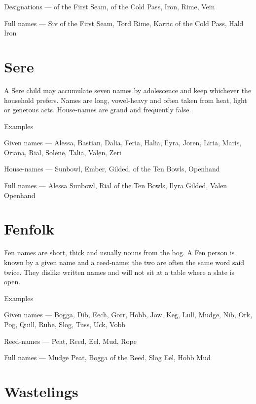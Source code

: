 \documentclass{design/chronicle}
\begin{document}
Designations — of the First Seam, of the Cold Pass, Iron, Rime, Vein\par

Full names — Siv of the First Seam, Tord Rime, Karric of the Cold Pass, Hald Iron\par

\section*{Sere}

A Sere child may accumulate seven names by adolescence and keep whichever the household prefers. Names are long, vowel-heavy and often taken from heat, light or generous acts. House-names are grand and frequently false.

Examples\par

Given names — Alessa, Bastian, Dalia, Feria, Halia, Ilyra, Joren, Liria, Maris, Oriana, Rial, Solene, Talia, Valen, Zeri\par

House-names — Sunbowl, Ember, Gilded, of the Ten Bowls, Openhand\par

Full names — Alessa Sunbowl, Rial of the Ten Bowls, Ilyra Gilded, Valen Openhand\par

\section*{Fenfolk}

Fen names are short, thick and usually nouns from the bog. A Fen person is known by a given name and a reed-name; the two are often the same word said twice. They dislike written names and will not sit at a table where a slate is open.

Examples\par

Given names — Bogga, Dib, Eech, Gorr, Hobb, Jow, Keg, Lull, Mudge, Nib, Ork, Pog, Quill, Rube, Slog, Tuss, Uck, Vobb\par

Reed-names — Peat, Reed, Eel, Mud, Rope\par

Full names — Mudge Peat, Bogga of the Reed, Slog Eel, Hobb Mud\par

\section*{Wastelings}
\end{document}
